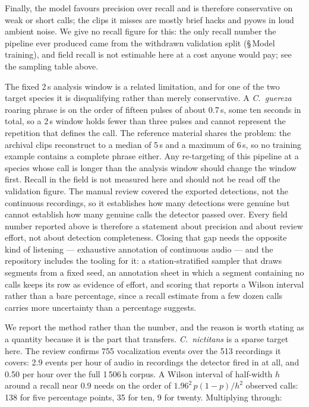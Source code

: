 \documentclass[review,3p,times]{elsarticle}
\begin{document}
Finally, the model favours precision over recall and is therefore conservative
on weak or short calls; the clips it misses are mostly brief hacks and pyows in
loud ambient noise. We give no recall figure for this: the only recall number
the pipeline ever produced came from the withdrawn validation split
(\S\,Model training), and field recall is not estimable here at a cost anyone
would pay; see the sampling table above.

The fixed 2\,s analysis window is a related limitation, and for one of the two
target species it is disqualifying rather than merely conservative. A
\textit{C.\ guereza} roaring phrase is on the order of fifteen pulses of about
0.7\,s, some ten seconds in total, so a 2\,s window holds fewer than three
pulses and cannot represent the repetition that defines the call. The reference
material shares the problem: the archival clips reconstruct to a median of 5\,s
and a maximum of 6\,s, so no training example contains a complete phrase
either. Any re-targeting of this pipeline at a species whose call is longer than
the analysis window should change the window first.
Recall in the field is not measured here and should not be read off the
validation figure. The manual review covered the exported detections, not the
continuous recordings, so it establishes how many detections were genuine but
cannot establish how many genuine calls the detector passed over. Every field
number reported above is therefore a statement about precision and about review
effort, not about detection completeness. Closing that gap needs the opposite
kind of listening --- exhaustive annotation of continuous audio --- and the
repository includes the tooling for it: a station-stratified sampler that draws
segments from a fixed seed, an annotation sheet in which a segment containing no
calls keeps its row as evidence of effort, and scoring that reports a Wilson
interval rather than a bare percentage, since a recall estimate from a few dozen
calls carries more uncertainty than a percentage suggests.

We report the method rather than the number, and the reason is worth stating as
a quantity because it is the part that transfers. \textit{C.\ nictitans} is a
sparse target here. The review confirms 755 vocalization events over the 513
recordings it covers: 2.9 events per hour of audio in recordings the detector
fired in at all, and 0.50 per hour over the full 1\,506\,h corpus. A Wilson
interval of half-width $h$ around a recall near 0.9 needs on the order of
$1.96^{2}\,p(1-p)/h^{2}$ observed calls: 138 for five percentage points, 35 for
ten, 9 for twenty. Multiplying through:
\end{document}
